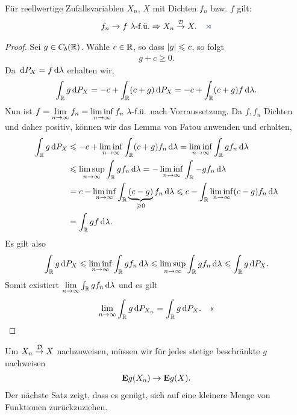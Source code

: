 \begin{prop}
\label{prop:9.8}
Für reellwertige Zufallsvariablen $X_n$, $X$ mit Dichten $f_n$
bzw. $f$ gilt:
\begin{align*}
f_n \rightarrow f \text{ $\lambda$-f.ü.} \Rightarrow X_n \Dto
X.\fishhere
\end{align*}
\end{prop}
\begin{proof}
Sei $g\in C_b(\R)$. Wähle $c\in\R$, so dass $\abs{g}\le c$, so folgt
\begin{align*}
g+c \ge 0.
\end{align*}
Da $\dP_X = f\dlambda$ erhalten wir,
\begin{align*}
\int_\R g\dP_X = - c +\int_\R (c+g) \dP_X =
-c+ \int_\R (c+g) f\dlambda.
\end{align*}
Nun ist $f = \lim\limits_{n\to\infty} f_n = \liminf\limits_{n\to\infty} 
f_n\fu{\lambda}$ nach Vorraussetzung. Da $f,f_n$ Dichten und daher positiv,
können wir das Lemma von Fatou anwenden und erhalten,
\begin{align*}
\int_\R g\dP_X &\le - c  +\liminf\limits_{n\to\infty} \int_\R (c+g) f_n\dlambda
=  \liminf\limits_{n\to\infty} \int_\R g f_n\dlambda\\
&\le \limsup\limits_{n\to\infty} \int_\R g f_n\dlambda
= -\liminf\limits_{n\to\infty} \int_\R - g f_n\dlambda\\
&= c-\liminf\limits_{n\to\infty} \int_\R \underbrace{(c-g)}_{\ge 0}f_n\dlambda
\le c-\int_\R \liminf\limits_{n\to\infty}(c-g)f_n\dlambda\\
&= \int_\R gf \dlambda.
\end{align*}
Es gilt also
\begin{align*}
\int_\R g\dP_X \le \liminf\limits_{n\to\infty} \int_\R g f_n \dlambda
\le \limsup\limits_{n\to\infty} \int_\R g f_n \dlambda \le \int_\R g\dP_X.
\end{align*}
Somit existiert $\lim\limits_{n\to\infty} \int_\R g f_n\dlambda$ und es gilt
\begin{align*}
\lim\limits_{n\to\infty} \int_\R g \dP_{X_n} = \int_\R g\dP_X.\qedhere
\end{align*}
\end{proof}

Um $X_n\Dto X$ nachzuweisen, müssen wir für jedes stetige beschränkte $g$
nachweisen
\begin{align*}
\E g(X_n) \to \E g(X).
\end{align*}
Der nächste Satz zeigt, dass es genügt, sich auf eine kleinere Menge von
Funktionen zurückzuziehen.

